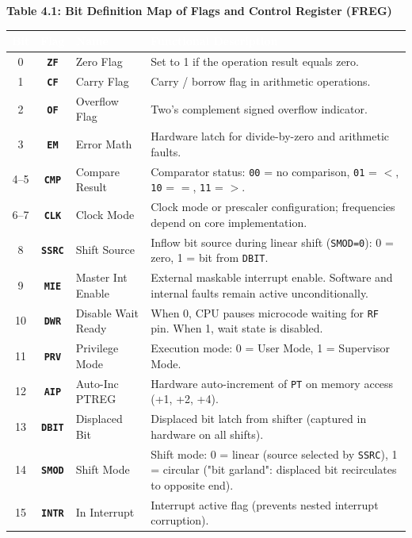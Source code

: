 \documentclass[11pt,a4paper]{article}
\begin{document}
\noindent\textbf{Table 4.1: Bit Definition Map of Flags and Control Register (FREG)}
\par\vspace{1.5mm}\noindent
{\small
\begin{tabularx}{\textwidth}{c c l X}
\toprule
\rowcolor{limslate}
\textcolor{white}{\textbf{Bit}} & \textcolor{white}{\textbf{Flag}} & \textcolor{white}{\textbf{Name}} & \textcolor{white}{\textbf{Functional Description}} \\
\midrule
\rowcolors{2}{limroweven}{white}
0 & \textbf{\texttt{ZF}} & Zero Flag & Set to 1 if the operation result equals zero. \\
1 & \textbf{\texttt{CF}} & Carry Flag & Carry / borrow flag in arithmetic operations. \\
2 & \textbf{\texttt{OF}} & Overflow Flag & Two's complement signed overflow indicator. \\
3 & \textbf{\texttt{EM}} & Error Math & Hardware latch for divide-by-zero and arithmetic faults. \\
4--5 & \textbf{\texttt{CMP}} & Compare Result & Comparator status: \texttt{00} = no comparison, \texttt{01} = \(<\), \texttt{10} = \(=\), \texttt{11} = \(>\). \\
6--7 & \textbf{\texttt{CLK}} & Clock Mode & Clock mode or prescaler configuration; frequencies depend on core implementation. \\
8 & \textbf{\texttt{SSRC}} & Shift Source & Inflow bit source during linear shift (\texttt{SMOD=0}): 0 = zero, 1 = bit from \texttt{DBIT}. \\
9 & \textbf{\texttt{MIE}} & Master Int Enable & External maskable interrupt enable. Software and internal faults remain active unconditionally. \\
10 & \textbf{\texttt{DWR}} & Disable Wait Ready & When 0, CPU pauses microcode waiting for \texttt{RF} pin. When 1, wait state is disabled. \\
11 & \textbf{\texttt{PRV}} & Privilege Mode & Execution mode: 0 = User Mode, 1 = Supervisor Mode. \\
12 & \textbf{\texttt{AIP}} & Auto-Inc PTREG & Hardware auto-increment of \texttt{PT} on memory access (+1, +2, +4). \\
13 & \textbf{\texttt{DBIT}} & Displaced Bit & Displaced bit latch from shifter (captured in hardware on all shifts). \\
14 & \textbf{\texttt{SMOD}} & Shift Mode & Shift mode: 0 = linear (source selected by \texttt{SSRC}), 1 = circular ("bit garland": displaced bit recirculates to opposite end). \\
15 & \textbf{\texttt{INTR}} & In Interrupt & Interrupt active flag (prevents nested interrupt corruption). \\
\bottomrule
\end{tabularx}
}
\end{document}
